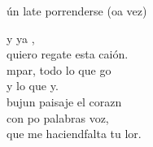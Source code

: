 \begin{cancion}
\begin{chorus}
		ún late porrenderse (oa vez)\jump\\
	\end{chorus}%
	y ya , \\
	quiero regate esta caión.\\
	mpar, todo lo que go \\
	y lo que y.\\
	bujun paisaje  el corazn\\
	con po palabras  voz,\\
	que me haciendfalta tu lor.\\
\end{cancion}%
